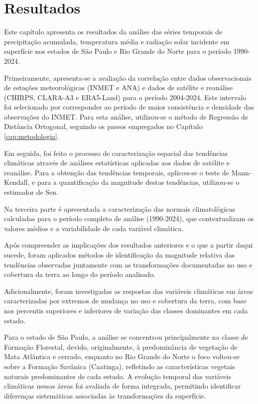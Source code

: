 \chapter{Resultados}
\label{cap:resultados}

Este capítulo apresenta os resultados da análise das séries temporais de 
precipitação acumulada, temperatura média e radiação solar incidente em 
superfície nos estados de São Paulo e Rio Grande do Norte para o período 
1990-2024.

Primeiramente, apresenta-se a avaliação da correlação entre dados observacionais 
de estações meteorológicas (INMET e ANA) e dados de satélite e reanálise 
(CHIRPS, CLARA-A3 e ERA5-Land) para o período 2004-2024. Este intervalo foi selecionado por corresponder ao período de maior consistência 
e densidade das observações do INMET. Para esta análise, utilizou-se o 
método de Regressão de Distância Ortogonal, seguindo os passos empregados no Capítulo \ref{cap:metodologia}.

Em seguida, foi feito o processo de caracterização espacial das tendências climáticas 
através de análises estatísticas aplicadas aos dados de satélite e reanálise.
Para a obtenção das tendências temporais, aplicou-se o teste de Mann-Kendall, e para a quantificação da magnitude destas tendências, utilizou-se o estimador de Sen.

Na terceira parte é apresentada a caracterização das normais climatológicas calculadas 
para o período completo de análise (1990-2024), que contextualizam os valores 
médios e a variabilidade de cada variável climática. 

Após compreender as implicações dos resultados anteriores e o que a partir daqui sucede, foram aplicados métodos de identificação da magnitude relativa das tendências observadas juntamente com as transformações documentadas no uso e 
cobertura da terra ao longo do período analisado.

Adicionalmente, foram investigadas as respostas das variáveis climáticas em áreas caracterizadas por extremos de mudança no uso e cobertura da terra, com base nos percentis superiores e inferiores de variação das classes dominantes em cada estado.

Para o estado de São Paulo, a análise se concentrou principalmente na classe de Formação Florestal, devido, originalmente, à predominância de vegetação de Mata Atlântica e cerrado, enquanto no Rio Grande do Norte o foco voltou-se sobre a Formação Savânica (Caatinga), refletindo as características vegetais naturais predominantes de cada estado. A evolução temporal das variáveis climáticas nessas áreas foi avaliada de forma integrada, permitindo identificar diferenças sistemáticas associadas às transformações da superfície.

